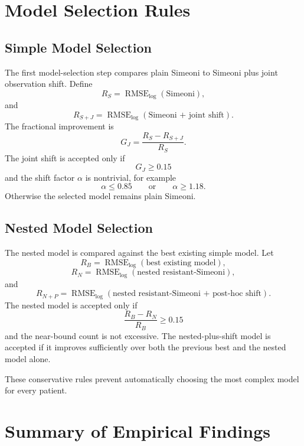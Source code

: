\documentclass[11pt,a4paper]{article}
\begin{document}
\section{Model Selection Rules}

\subsection{Simple Model Selection}

The first model-selection step compares plain Simeoni to Simeoni plus joint observation shift. Define
\[
    R_S = \operatorname{RMSE}_{\log}(\text{Simeoni}),
\]
and
\[
    R_{S+J} = \operatorname{RMSE}_{\log}(\text{Simeoni + joint shift}).
\]
The fractional improvement is
\[
    G_{J} = \frac{R_S-R_{S+J}}{R_S}.
\]
The joint shift is accepted only if
\[
    G_J \geq 0.15
\]
and the shift factor $\alpha$ is nontrivial, for example
\[
    \alpha \leq 0.85
    \qquad \text{or} \qquad
    \alpha \geq 1.18.
\]
Otherwise the selected model remains plain Simeoni.

\subsection{Nested Model Selection}

The nested model is compared against the best existing simple model. Let
\[
    R_B = \operatorname{RMSE}_{\log}(\text{best existing model}),
\]
\[
    R_N = \operatorname{RMSE}_{\log}(\text{nested resistant-Simeoni}),
\]
and
\[
    R_{N+P} = \operatorname{RMSE}_{\log}(\text{nested resistant-Simeoni + post-hoc shift}).
\]
The nested model is accepted only if
\[
    \frac{R_B-R_N}{R_B}\geq 0.15
\]
and the near-bound count is not excessive. The nested-plus-shift model is accepted if it improves sufficiently over both the previous best and the nested model alone.

These conservative rules prevent automatically choosing the most complex model for every patient.

\section{Summary of Empirical Findings}
\end{document}
